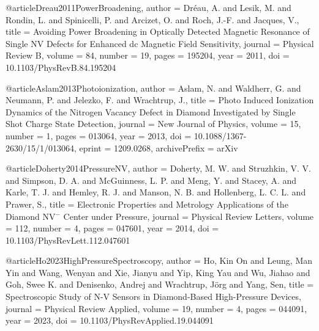 

@article{Dreau2011PowerBroadening,
  author  = {Dr{\'e}au, A. and Lesik, M. and Rondin, L. and Spinicelli, P. and Arcizet, O. and Roch, J.-F. and Jacques, V.},
  title   = {Avoiding Power Broadening in Optically Detected Magnetic Resonance of Single {NV} Defects for Enhanced dc Magnetic Field Sensitivity},
  journal = {Physical Review B},
  volume  = {84},
  number  = {19},
  pages   = {195204},
  year    = {2011},
  doi     = {10.1103/PhysRevB.84.195204}
}

@article{Aslam2013Photoionization,
  author  = {Aslam, N. and Waldherr, G. and Neumann, P. and Jelezko, F. and Wrachtrup, J.},
  title   = {Photo Induced Ionization Dynamics of the Nitrogen Vacancy Defect in Diamond Investigated by Single Shot Charge State Detection},
  journal = {New Journal of Physics},
  volume  = {15},
  number  = {1},
  pages   = {013064},
  year    = {2013},
  doi     = {10.1088/1367-2630/15/1/013064},
  eprint  = {1209.0268},
  archivePrefix = {arXiv}
}


@article{Doherty2014PressureNV,
  author  = {Doherty, M. W. and Struzhkin, V. V. and Simpson, D. A. and McGuinness, L. P. and Meng, Y. and Stacey, A. and Karle, T. J. and Hemley, R. J. and Manson, N. B. and Hollenberg, L. C. L. and Prawer, S.},
  title   = {Electronic Properties and Metrology Applications of the Diamond {NV$^-$} Center under Pressure},
  journal = {Physical Review Letters},
  volume  = {112},
  number  = {4},
  pages   = {047601},
  year    = {2014},
  doi     = {10.1103/PhysRevLett.112.047601}
}

@article{Ho2023HighPressureSpectroscopy,
  author  = {Ho, Kin On and Leung, Man Yin and Wang, Wenyan and Xie, Jianyu and Yip, King Yau and Wu, Jiahao and Goh, Swee K. and Denisenko, Andrej and Wrachtrup, J{\"o}rg and Yang, Sen},
  title   = {Spectroscopic Study of {N-V} Sensors in Diamond-Based High-Pressure Devices},
  journal = {Physical Review Applied},
  volume  = {19},
  number  = {4},
  pages   = {044091},
  year    = {2023},
  doi     = {10.1103/PhysRevApplied.19.044091}
}

